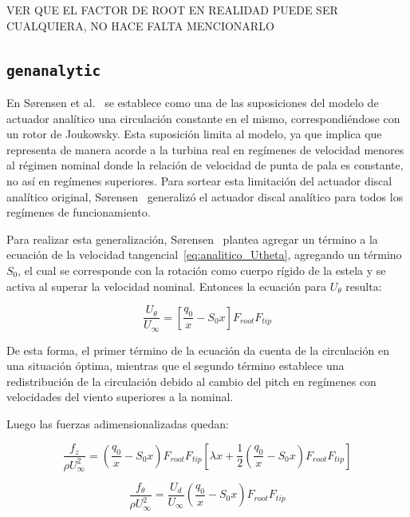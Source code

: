 {\LARGE VER QUE EL FACTOR DE ROOT EN REALIDAD PUEDE SER CUALQUIERA, NO HACE FALTA MENCIONARLO}

\subsection{\texttt{genanalytic}}

En Sørensen et al.~\cite{sorensen2020} se establece como una de las suposiciones del modelo de actuador analítico una circulación constante en el mismo, correspondiéndose con un rotor de Joukowsky. Esta suposición limita al modelo, ya que implica que representa de manera acorde a la turbina real en regímenes de velocidad menores al régimen nominal donde la relación de velocidad de punta de pala es constante, no así en regímenes superiores. Para sortear esta limitación del actuador discal analítico original, Sørensen~\cite{sorensen2023} generalizó el actuador discal analítico para todos los regímenes de funcionamiento.

Para realizar esta generalización, Sørensen~\cite{sorensen2023} plantea agregar un término a la ecuación de la velocidad tangencial~\ref{eq:analitico_Utheta}, agregando un término $S_0$, el cual se corresponde con la rotación como cuerpo rígido de la estela y se activa al superar la velocidad nominal. Entonces la ecuación para $U_\theta$ resulta:

\begin{equation}
\frac{U_\theta}{U_\infty} = \left[\frac{q_0}{x} - S_0 x\right]F_{root}F_{tip}
\label{eq:genanalytic_Utheta}
\end{equation}

De esta forma, el primer término de la ecuación da cuenta de la circulación en una situación óptima, mientras que el segundo término establece una redistribución de la circulación debido al cambio del pitch en regímenes con velocidades del viento superiores a la nominal.

Luego las fuerzas adimensionalizadas quedan:

\begin{equation}
\frac{f_z}{\rho U_\infty^2} = \left(\frac{q_0}{x} - S_0 x\right)F_{root}F_{tip}\left[\lambda x + \frac{1}{2}\left(\frac{q_0}{x} - S_0 x\right)F_{root}F_{tip}\right]
\label{eq:genanalytic_fz}
\end{equation}

\begin{equation}
\frac{f_\theta}{\rho U_\infty^2} = \frac{U_d}{U_\infty}\left(\frac{q_0}{x} - S_0 x\right)F_{root}F_{tip}
\label{eq:genanalytic_ftheta}
\end{equation}

